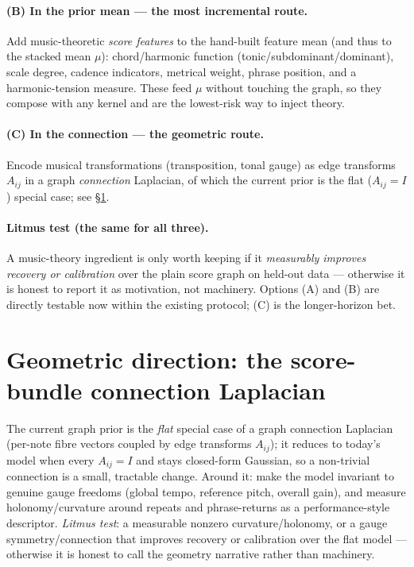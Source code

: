 \documentclass[11pt,a4paper]{report}
\begin{document}
\paragraph{(B) In the prior mean --- the most incremental route.}
Add music-theoretic \emph{score features} to the hand-built feature mean (and thus to
the stacked mean $\mu$): chord/harmonic function (tonic/subdominant/dominant), scale
degree, cadence indicators, metrical weight, phrase position, and a harmonic-tension
measure. These feed $\mu$ without touching the graph, so they compose with any kernel
and are the lowest-risk way to inject theory.

\paragraph{(C) In the connection --- the geometric route.}
Encode musical transformations (transposition, tonal gauge) as edge transforms
$A_{ij}$ in a graph \emph{connection} Laplacian, of which the current prior is the flat
($A_{ij} = I$) special case; see \S\ref{sec:future-geom}.

\paragraph{Litmus test (the same for all three).} A music-theory ingredient is only
worth keeping if it \emph{measurably improves recovery or calibration} over the plain
score graph on held-out data --- otherwise it is honest to report it as motivation, not
machinery. Options (A) and (B) are directly testable now within the existing protocol;
(C) is the longer-horizon bet.

\section{Geometric direction: the score-bundle connection Laplacian}\label{sec:future-geom}
The current graph prior is the \emph{flat} special case of a graph connection
Laplacian (per-note fibre vectors coupled by edge transforms $A_{ij}$); it reduces
to today's model when every $A_{ij} = I$ and stays closed-form Gaussian, so a
non-trivial connection is a small, tractable change. Around it: make the model
invariant to genuine gauge freedoms (global tempo, reference pitch, overall gain),
and measure holonomy/curvature around repeats and phrase-returns as a
performance-style descriptor. \emph{Litmus test}: a measurable nonzero
curvature/holonomy, or a gauge symmetry/connection that improves recovery or
calibration over the flat model --- otherwise it is honest to call the geometry
narrative rather than machinery.
\end{document}
